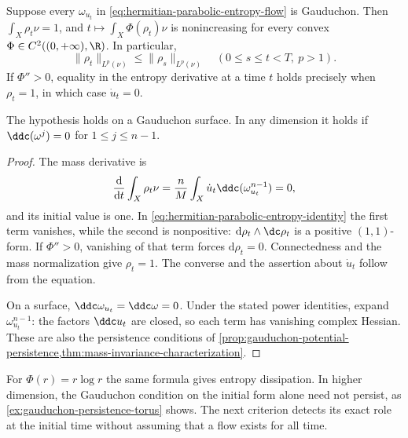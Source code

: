 \begin{corollary}\label{cor:gauduchon-parabolic-entropies}
Suppose every $\omega_{u_t}$ in \eqref{eq:hermitian-parabolic-entropy-flow} is Gauduchon. Then $\int_X\rho_t\nu=1$, and $t\mapsto\int_X\Phi(\rho_t)\nu$ is nonincreasing for every convex $\Phi\in C^2((0,+\infty),\R)$. In particular,
\[
 \|\rho_t\|_{L^p(\nu)}\leq\|\rho_s\|_{L^p(\nu)}
 \quad(0\leq s\leq t<T,\ p>1).
\]
If $\Phi''>0$, equality in the entropy derivative at a time $t$ holds precisely when $\rho_t=1$, in which case $\dot u_t=0$.

The hypothesis holds on a Gauduchon surface. In any dimension it holds if $\ddc(\omega^j)=0$ for $1\leq j\leq n-1$.
\end{corollary}
\begin{proof}
The mass derivative is
\[
 \frac{\mathrm{d}}{\mathrm{d}t}\int_X\rho_t\nu
 =\frac nM\int_X\dot u_t\ddc(\omega_{u_t}^{n-1})=0,
\]
and its initial value is one. In \eqref{eq:hermitian-parabolic-entropy-identity} the first term vanishes, while the second is nonpositive: $\mathrm{d}\rho_t\wedge\dc\rho_t$ is a positive $(1,1)$-form. If $\Phi''>0$, vanishing of that term forces $\mathrm{d}\rho_t=0$. Connectedness and the mass normalization give $\rho_t=1$. The converse and the assertion about $\dot u_t$ follow from the equation.

On a surface, $\ddc\omega_{u_t}=\ddc\omega=0$. Under the stated power identities, expand $\omega_{u_t}^{n-1}$: the factors $\ddc u_t$ are closed, so each term has vanishing complex Hessian. These are also the persistence conditions of \cref{prop:gauduchon-potential-persistence,thm:mass-invariance-characterization}.
\end{proof}

For $\Phi(r)=r\log r$ the same formula gives entropy dissipation. In higher dimension, the Gauduchon condition on the initial form alone need not persist, as \cref{ex:gauduchon-persistence-torus} shows. The next criterion detects its exact role at the initial time without assuming that a flow exists for all time.

